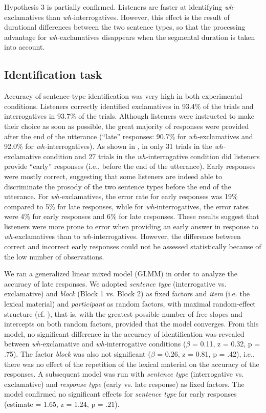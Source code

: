 \documentclass[output=paper]{langsci/langscibook}
\begin{document}
Hypothesis 3 is partially confirmed. Listeners are faster at identifying \textit{wh-}exclamatives than \textit{wh-}interrogatives. However, this effect is the result of durational differences between the two sentence types, so that the processing advantage for \textit{wh-}exclamatives disappears when the segmental duration is taken into account.

   
\subsection{Identification task}
\label{sec:kel:5.1}
Accuracy of sentence-type identification was very high in both experimental conditions. Listeners correctly identified exclamatives in 93.4\% of the trials and interrogatives in 93.7\% of the trials. Although listeners were instructed to make their choice as soon as possible, the great majority of responses were provided after the end of the utterance (“late” responses: 90.7\% for \textit{wh-}exclamatives and 92.0\% for \textit{wh-}interrogatives). As shown in , in only 31 trials in the \textit{wh-}exclamative condition and 27 trials in the \textit{wh-}interrogative condition did listeners provide “early” responses (i.e., before the end of the utterance). Early responses were mostly correct, suggesting that some listeners are indeed able to discriminate the prosody of the two sentence types before the end of the utterance. For \textit{wh-}exclamatives, the error rate for early responses was 19\% compared to 5\% for late responses, while for \textit{wh-}interrogatives, the error rates were 4\% for early responses and 6\% for late responses. These results suggest that listeners were more prone to error when providing an early answer in response to \textit{wh-}exclamatives than to \textit{wh-}interrogatives. However, the difference between correct and incorrect early responses could not be assessed statistically because of the low number of observations. 

We ran a generalized linear mixed model (GLMM) in order to analyze the accuracy of late responses. We adopted \textit{sentence type} (interrogative vs. exclamative) and \textit{block} (Block 1 vs. Block 2) as fixed factors and \textit{item} (i.e. the lexical material) and \textit{participant} as random factors, with maximal random-effect structure (cf. \citealt{Barr2013}), that is, with the greatest possible number of free slopes and intercepts on both random factors, provided that the model converges. From this model, no significant difference in the accuracy of identification was revealed between \textit{wh-}exclamative and \textit{wh-}interrogative conditions ($\beta $ = 0.11, z = 0.32, p = .75). The factor \textit{block} was also not significant ($\beta $ = 0.26, z = 0.81, p = .42), i.e., there was no effect of the repetition of the lexical material on the accuracy of the responses. A subsequent model was run with \textit{sentence type} (interrogative vs. exclamative) and \textit{response type} (early vs. late response) as fixed factors. The model confirmed no significant effects for \textit{sentence type} for early responses (estimate = 1.65, z = 1.24, p = .21).
\end{document}
